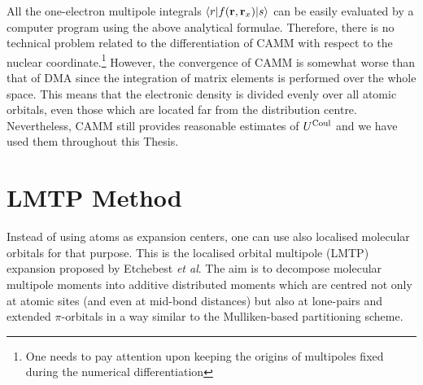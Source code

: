 \documentclass[b5paper,oneside,fleqn,11pt]{book}
\begin{document}
\begin{appendices}
\begin{refsection}
All the one\hyp{}electron multipole integrals 
$\langle r \lvert f({\bf r},{\bf r}_x)\rvert s \rangle$ 
can be easily 
evaluated by a computer program using the above analytical formulae.
Therefore, there is no technical problem related to the differentiation of CAMM
with respect to the nuclear coordinate.\footnote{One needs to pay attention
upon keeping the origins of multipoles fixed during the numerical differentiation}
However, the convergence of CAMM
is somewhat worse than that of DMA since the integration of matrix elements 
is performed over the whole space. This means that the electronic density
is divided evenly over all atomic orbitals, even those which are located far
from the distribution centre. Nevertheless, CAMM still provides reasonable 
estimates of $U^{\rm Coul}$ and we have used them throughout this Thesis.

\section{LMTP Method}

Instead of using atoms as expansion centers, one can use also localised molecular orbitals
for that purpose. This is the localised orbital multipole (LMTP) expansion 
proposed by Etchebest \emph{et al}. \citep{Etchebest.Lavery.Pullman.TheorChimActa.1982}
The aim is to decompose molecular multipole moments into additive
distributed moments which are centred not only at atomic sites
(and even at mid\hyp{}bond distances) but also at lone\hyp{}pairs 
and extended $\pi$\hyp{}orbitals in a way similar to the Mulliken\hyp{}based
partitioning scheme.


\end{refsection}
\end{appendices}
\end{document}
